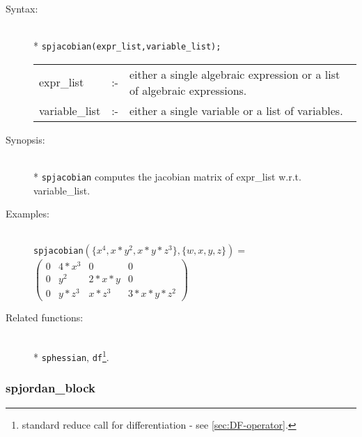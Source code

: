 \begin{description}
\item[Syntax:]\mbox{}\\*
\texttt{spjacobian(expr\_list,variable\_list);}\\[2mm]
\begin{tabular}{l l p{.72\linewidth}}
expr\_list    &:-& either a
single algebraic expression or a list of algebraic expressions.\\
variable\_list &:-& either a single variable or a list of variables.
\end{tabular}

\item[Synopsis:]\mbox{}\\*
\texttt{spjacobian} computes the jacobian matrix of expr\_list w.r.t.
variable\_list.

\item[Examples:]\mbox{}\\
\texttt{spjacobian}\((\{x^4,x*y^2,x*y*z^3\},\{w,x,y,z\}) =\) \\[2mm]
\(\begin{pmatrix} 0 & 4*x^3 & 0 & 0 \\ 0 & y^2 & 2*x*y & 0 \\
0 & y*z^3 & x*z^3 & 3*x*y*z^2
\end{pmatrix}\)

\item[Related functions:]\mbox{}\\*
\texttt{sphessian}, \texttt{df}\footnote{standard reduce call
for differentiation - see \protect\ref{sec:DF-operator}.}.
\end{description}

\subsubsection{spjordan\_block}
\label{sparse:spjordan_block}

